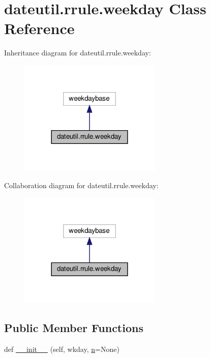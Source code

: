 \hypertarget{classdateutil_1_1rrule_1_1weekday}{}\section{dateutil.\+rrule.\+weekday Class Reference}
\label{classdateutil_1_1rrule_1_1weekday}


Inheritance diagram for dateutil.\+rrule.\+weekday\+:
\nopagebreak
\begin{figure}[H]
\begin{center}
\leavevmode
\includegraphics[width=192pt]{classdateutil_1_1rrule_1_1weekday__inherit__graph}
\end{center}
\end{figure}


Collaboration diagram for dateutil.\+rrule.\+weekday\+:
\nopagebreak
\begin{figure}[H]
\begin{center}
\leavevmode
\includegraphics[width=192pt]{classdateutil_1_1rrule_1_1weekday__coll__graph}
\end{center}
\end{figure}
\subsection*{Public Member Functions}
\begin{DoxyCompactItemize}
\item 
def \hyperlink{classdateutil_1_1rrule_1_1weekday_a9eb2e55dd6a0c0a8125967b6225327cc}{\+\_\+\+\_\+init\+\_\+\+\_\+} (self, wkday, \hyperlink{classdateutil_1_1__common_1_1weekday_afc8255cecf49484808e4a59ef4ca5ff1}{n}=None)
\end{DoxyCompactItemize}


